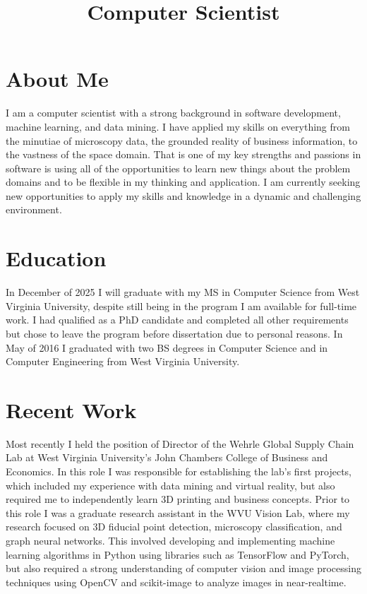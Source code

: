 \documentclass[11pt,a4paper,sans]{moderncv}        %
\title{Computer Scientist}                               %
\begin{document}

\makelettertitle


\section{About Me}

I am a computer scientist with a strong background in software development, machine learning, and data mining.
I have applied my skills on everything from the minutiae of microscopy data, the grounded reality of business information, to the vastness of the space domain. 
That is one of my key strengths and passions in software is using all of the opportunities to learn new things about the problem domains and to be flexible in my thinking and application. 
I am currently seeking new opportunities to apply my skills and knowledge in a dynamic and challenging environment.

\section {Education}

In December of 2025 I will graduate with my MS in Computer Science from West Virginia University, despite still being in the program I am available for full-time work.  
I had qualified as a PhD candidate and completed all other requirements but chose to leave the program before dissertation due to personal reasons.
In May of 2016 I graduated with two BS degrees in Computer Science and in Computer Engineering from West Virginia University.

\section {Recent Work}

Most recently I held the position of Director of the Wehrle Global Supply Chain Lab at West Virginia University's John Chambers College of Business and Economics.
In this role I was responsible for establishing the lab's first projects, which included my experience with data mining and virtual reality, but also required me to independently learn 3D printing and business concepts.
Prior to this role I was a graduate research assistant in the WVU Vision Lab, where my research focused on 3D fiducial point detection, microscopy classification, and graph neural networks. 
This involved developing and implementing machine learning algorithms in Python using libraries such as TensorFlow and PyTorch, but also required a strong understanding of computer vision and image processing techniques using OpenCV and scikit-image to analyze images in near-realtime.
\end{document}
